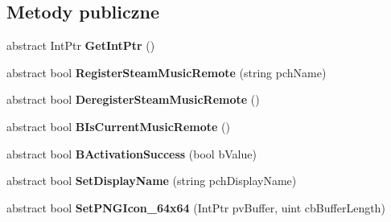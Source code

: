 \subsection*{Metody publiczne}
\begin{DoxyCompactItemize}
\item 
\mbox{\label{class_valve_1_1_steamworks_1_1_i_steam_music_remote_af04f27e138ed4636fdc1e4a0b9ea268d}} 
abstract Int\+Ptr {\bfseries Get\+Int\+Ptr} ()
\item 
\mbox{\label{class_valve_1_1_steamworks_1_1_i_steam_music_remote_a0b70d8fe4222e3721eb8d596d2d7b995}} 
abstract bool {\bfseries Register\+Steam\+Music\+Remote} (string pch\+Name)
\item 
\mbox{\label{class_valve_1_1_steamworks_1_1_i_steam_music_remote_a85a1bf32599517eda17dfe00ea2ffb3c}} 
abstract bool {\bfseries Deregister\+Steam\+Music\+Remote} ()
\item 
\mbox{\label{class_valve_1_1_steamworks_1_1_i_steam_music_remote_aa0478178af54d4315596500e79e6aee8}} 
abstract bool {\bfseries B\+Is\+Current\+Music\+Remote} ()
\item 
\mbox{\label{class_valve_1_1_steamworks_1_1_i_steam_music_remote_a54aa7d740d3cfbe27cf0216e8e5b349e}} 
abstract bool {\bfseries B\+Activation\+Success} (bool b\+Value)
\item 
\mbox{\label{class_valve_1_1_steamworks_1_1_i_steam_music_remote_ac13a845da239651cbe3d3a59dd058f50}} 
abstract bool {\bfseries Set\+Display\+Name} (string pch\+Display\+Name)
\item 
\mbox{\label{class_valve_1_1_steamworks_1_1_i_steam_music_remote_a2063023536807bd6bb9afc6788893a38}} 
abstract bool {\bfseries Set\+P\+N\+G\+Icon\+\_\+64x64} (Int\+Ptr pv\+Buffer, uint cb\+Buffer\+Length)
\item 
\mbox{\label{class_valve_1_1_steamworks_1_1_i_steam_music_remote_a5fc3e8081b7f348aae512ce2a79e754d}} 

\end{DoxyCompactItemize}
